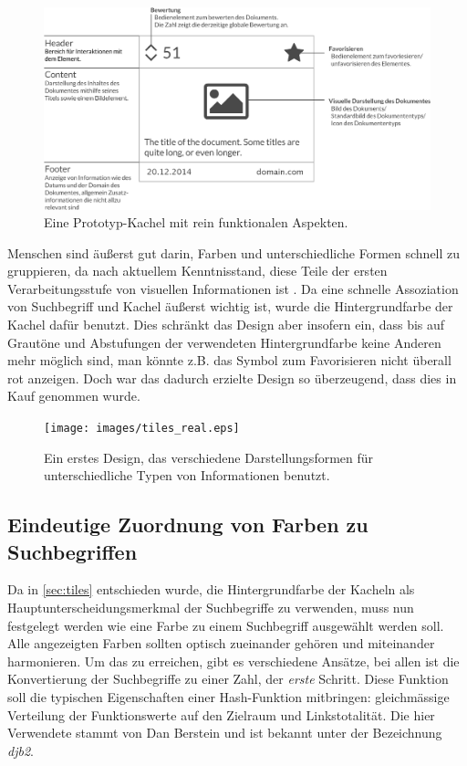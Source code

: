 \documentclass[12pt,twoside]{book}
\begin{document}
\begin{figure}[h]
    \centering
    \includegraphics[width=1.0\textwidth]{images/tiles.eps}
    \caption{Eine Prototyp-Kachel mit rein funktionalen Aspekten.}
    \label{fig:tile_prototype}
\end{figure}

Menschen sind äußerst gut darin, Farben und unterschiedliche Formen schnell zu gruppieren, da nach aktuellem Kenntnisstand, diese Teile der ersten Verarbeitungsstufe von visuellen Informationen ist \citep{treisman1987merkmale}. Da eine schnelle Assoziation von Suchbegriff und Kachel äußerst wichtig ist, wurde die Hintergrundfarbe der Kachel dafür benutzt. Dies schränkt das Design aber insofern ein, dass bis auf Grautöne und Abstufungen der verwendeten Hintergrundfarbe keine Anderen mehr möglich sind, man könnte z.B. das Symbol zum Favorisieren nicht überall rot anzeigen. Doch war das dadurch erzielte Design so überzeugend, dass dies in Kauf genommen wurde.

\begin{figure}[h]
    \centering
    \texttt{[image: images/tiles\_real.eps]}
    \caption{Ein erstes Design, das verschiedene Darstellungsformen für unterschiedliche Typen von Informationen benutzt.}
    \label{fig:awesome_image}
\end{figure}

\subsection{Eindeutige Zuordnung von Farben zu Suchbegriffen}

Da in \ref{sec:tiles} entschieden wurde, die Hintergrundfarbe der Kacheln als Hauptunterscheidungsmerkmal der Suchbegriffe zu verwenden, muss nun festgelegt werden wie eine Farbe zu einem Suchbegriff ausgewählt werden soll.
Alle angezeigten Farben sollten optisch zueinander gehören und miteinander harmonieren. Um das zu erreichen, gibt es verschiedene Ansätze, bei allen ist die Konvertierung der Suchbegriffe zu einer Zahl, der \textit{erste} Schritt. Diese Funktion soll die typischen Eigenschaften einer  Hash-Funktion mitbringen: gleichmässige Verteilung der Funktionswerte auf den Zielraum und Linkstotalität.
Die hier Verwendete stammt von Dan Berstein und ist bekannt unter der Bezeichnung \textit{djb2}.
\end{document}
